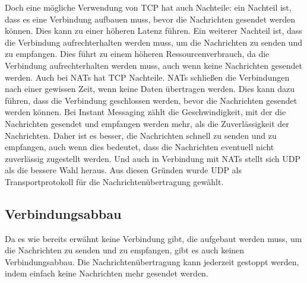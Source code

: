 Doch eine mögliche Verwendung von TCP hat auch Nachteile: ein Nachteil ist, dass es eine Verbindung aufbauen muss, bevor die Nachrichten gesendet werden können. Dies kann zu einer höheren Latenz führen. Ein weiterer Nachteil ist, dass die Verbindung aufrechterhalten werden muss, um die Nachrichten zu senden und zu empfangen. Dies führt zu einem höheren Ressourcenverbrauch, da die Verbindung aufrechterhalten werden muss, auch wenn keine Nachrichten gesendet werden. Auch bei NATs hat TCP Nachteile. NATs schließen die Verbindungen nach einer gewissen Zeit, wenn keine Daten übertragen werden. Dies kann dazu führen, dass die Verbindung geschlossen werden, bevor die Nachrichten gesendet werden können. Bei Instant Messaging zählt die Geschwindigkeit, mit der die Nachrichten gesendet und empfangen werden mehr, als die Zuverlässigkeit der Nachrichten.
Daher ist es besser, die Nachrichten schnell zu senden und zu empfangen, auch wenn dies bedeutet, dass die Nachrichten eventuell nicht zuverlässig zugestellt werden. Und auch in Verbindung mit NATs stellt sich UDP als die bessere Wahl heraus. Aus diesen Gründen wurde UDP als Transportprotokoll für die Nachrichtenübertragung gewählt.


\subsection{Verbindungsabbau}

Da es wie bereits erwähnt keine Verbindung gibt, die aufgebaut werden muss, um die Nachrichten zu senden und zu empfangen, gibt es auch keinen Verbindungsabbau. Die Nachrichtenübertragung kann jederzeit gestoppt werden, indem einfach keine Nachrichten mehr gesendet werden. 